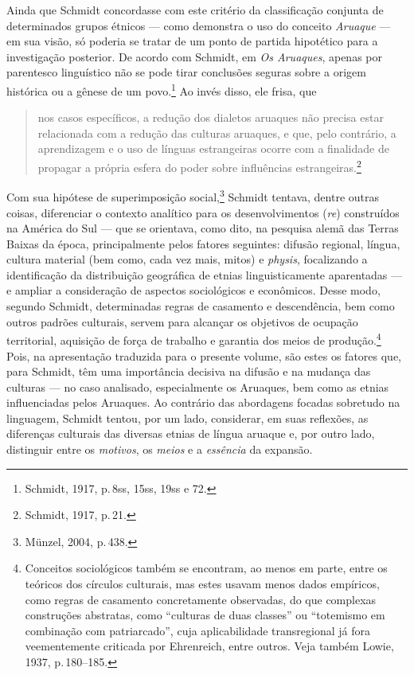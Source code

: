 Ainda que Schmidt concordasse com este critério da classificação
conjunta de determinados grupos étnicos --- como demonstra o uso do
conceito \textit{Aruaque} --- em sua visão, só poderia se tratar de um ponto
de partida hipotético para a investigação posterior. De acordo com
Schmidt, em \textit{Os Aruaques}, apenas por parentesco linguístico não se
pode tirar conclusões seguras sobre a origem histórica ou a gênese de um
povo.\footnote{Schmidt, 1917, p.\,8ss, 15ss, 19ss e 72.} Ao invés disso, ele frisa, que


\begin{quote}
nos casos específicos, a redução dos dialetos aruaques não precisa estar
relacionada com a redução das culturas aruaques, e que, pelo contrário, a
aprendizagem e o uso de línguas estrangeiras ocorre com a finalidade de
propagar a própria esfera do poder sobre influências
estrangeiras.\footnote{Schmidt, 1917, p.\,21.} %
\end{quote}

Com sua hipótese de superimposição social,\footnote{Münzel, 2004, p.\,438.}
Schmidt tentava, dentre outras coisas, diferenciar o contexto analítico
para os desenvolvimentos (\textit{re}) construídos na América do Sul --- que se
orientava, como dito, na pesquisa alemã das Terras Baixas da época,
principalmente pelos fatores seguintes: difusão regional, língua,
cultura material (bem como, cada vez mais, mitos) e \textit{physis},
focalizando a identificação da distribuição geográfica de etnias
linguisticamente aparentadas --- e ampliar a consideração de aspectos
sociológicos e econômicos. Desse modo, segundo Schmidt, determinadas
regras de casamento e descendência, bem como outros padrões culturais,
servem para alcançar os objetivos de ocupação territorial, aquisição de
força de trabalho e garantia dos meios de produção.\footnote{Conceitos
  sociológicos também se encontram, ao menos em parte, entre os teóricos
  dos círculos culturais, mas estes usavam menos dados empíricos, como
  regras de casamento concretamente observadas, do que complexas
  construções abstratas, como ``culturas de duas classes'' ou
  ``totemismo em combinação com patriarcado'', cuja aplicabilidade
  transregional já fora veementemente criticada por Ehrenreich, entre
  outros. Veja também Lowie, 1937, p.\,180--185.} Pois, na apresentação
traduzida para o presente volume, são estes os fatores que, para
Schmidt, têm uma importância decisiva na difusão e na mudança das
culturas --- no caso analisado, especialmente os Aruaques, bem como as
etnias influenciadas pelos Aruaques. Ao contrário das abordagens focadas
sobretudo na linguagem, Schmidt tentou, por um lado, considerar, em
suas reflexões, as diferenças culturais das diversas etnias de língua
aruaque e, por outro lado, distinguir entre os \textit{motivos}, os \textit{meios}
e a \textit{essência} da expansão.

